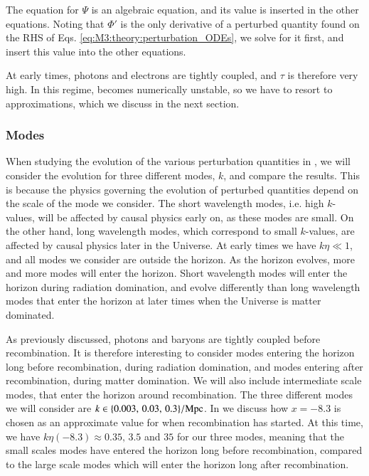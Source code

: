 The equation for $\Psi$ is an algebraic equation, and its value is inserted in the other equations. Noting that $\Phi'$ is the only derivative of a perturbed quantity found on the RHS of Eqs. \eqref{eq:M3:theory:perturbation_ODEs}, we solve for it first, and insert this value into the other equations. 

At early times, photons and electrons are tightly coupled, and $\tau$ is therefore very high. In this regime,  becomes numerically unstable, so we have to resort to approximations, which we discuss in the next section. 

\subsubsection{Modes }\label{sssec:M3:theory:modes}
When studying the evolution of the various perturbation quantities in , we will consider the evolution for three different modes, $k$, and compare the results. This is because the physics governing the evolution of perturbed quantities depend on the scale of the mode we consider. The short wavelength modes, i.e. high $k$-values, will be affected by causal physics early on, as these modes are small. On the other hand, long wavelength modes, which correspond to small $k$-values, are affected by causal physics later in the Universe. At early times we have $k\eta\ll 1$, and all modes we consider are outside the horizon. As the horizon evolves, more and more modes will enter the horizon. Short wavelength modes will enter the horizon during radiation domination, and evolve differently than long wavelength modes that enter the horizon at later times when the Universe is matter dominated.  

As previously discussed, photons and baryons are tightly coupled before recombination. It is therefore interesting to consider modes entering the horizon long before recombination, during radiation domination, and modes entering after recombination, during matter domination. We will also include intermediate scale modes, that enter the horizon around recombination. The three different modes we will consider are $k\in\nobreak\{ 0.003,\,0.03,\,0.3 \}/\mathrm{Mpc}$. In  we discuss how $x=-8.3$ is chosen as an approximate value for when recombination has started. At this time, we have $k\eta(-8.3)\approx0.35,\,3.5$ and $35$ for our three modes, meaning that the small scales modes have entered the horizon long before recombination, compared to the large scale modes which will enter the horizon long after recombination.   


